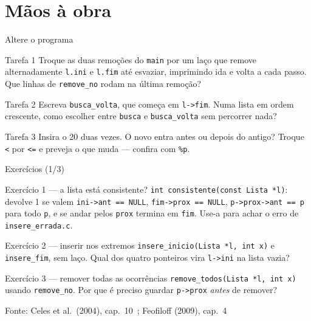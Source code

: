 \documentclass[aspectratio=169]{beamer}
\newcommand{\fonte}[1]{\vfill\hfill{\scriptsize\textcolor{UFSGray}{Fonte: #1}}}
\begin{document}
\section{Mãos à obra}

\begin{frame}{Altere o programa}
  \small
  \begin{block}{Tarefa 1}
    Troque as duas remoções do \texttt{main} por um laço que remove
    alternadamente \texttt{l.ini} e \texttt{l.fim} até esvaziar, imprimindo
    ida e volta a cada passo. Que linhas de \texttt{remove\_no} rodam na
    última remoção?
  \end{block}
  \begin{block}{Tarefa 2}
    Escreva \texttt{busca\_volta}, que começa em \texttt{l->fim}. Numa
    lista em ordem crescente, como escolher entre \texttt{busca} e
    \texttt{busca\_volta} sem percorrer nada?
  \end{block}
  \begin{block}{Tarefa 3}
    Insira o 20 duas vezes. O novo entra antes ou depois do antigo? Troque
    \texttt{<} por \texttt{<=} e preveja o que muda --- confira com
    \texttt{\%p}.
  \end{block}
\end{frame}

\begin{frame}{Exercícios (1/3)}
  \footnotesize
  \begin{block}{Exercício 1 --- a lista está consistente?}
    \texttt{int consistente(const Lista *l)}: devolve 1 se valem
    \texttt{ini->ant == NULL}, \texttt{fim->prox == NULL},
    \texttt{p->prox->ant == p} para todo \texttt{p}, e se andar pelos
    \texttt{prox} termina em \texttt{fim}. Use-a para achar o erro de
    \texttt{insere\_errada.c}.
  \end{block}
  \begin{block}{Exercício 2 --- inserir nos extremos}
    \texttt{insere\_inicio(Lista *l, int x)} e \texttt{insere\_fim}, sem
    laço. Qual dos quatro ponteiros vira \texttt{l->ini} na lista vazia?
  \end{block}
  \begin{block}{Exercício 3 --- remover todas as ocorrências}
    \texttt{remove\_todos(Lista *l, int x)} usando \texttt{remove\_no}.
    Por que é preciso guardar \texttt{p->prox} \emph{antes} de remover?
  \end{block}
  \fonte{Celes et al.\ (2004), cap.~10~\cite{celes2004introducao};
    Feofiloff (2009), cap.~4~\cite{feofiloff2009algoritmos}}
\end{frame}
\end{document}
